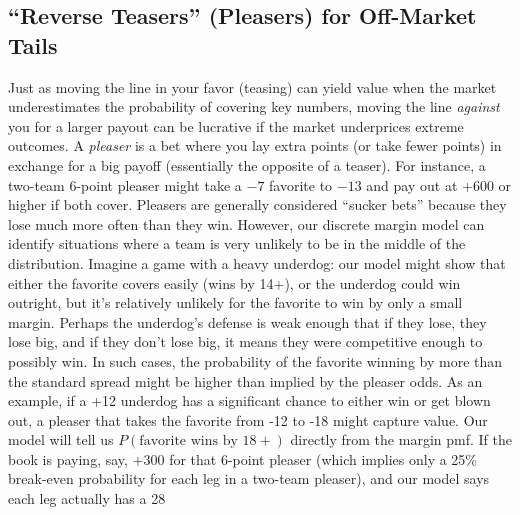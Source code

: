\documentclass[11pt]{amsart}
\begin{document}
\subsection{``Reverse Teasers'' (Pleasers) for Off-Market Tails}
Just as moving the line in your favor (teasing) can yield value when the market underestimates the probability of covering key numbers, moving the line \emph{against} you for a larger payout can be lucrative if the market underprices extreme outcomes. A \textit{pleaser} is a bet where you lay extra points (or take fewer points) in exchange for a big payoff (essentially the opposite of a teaser). For instance, a two-team 6-point pleaser might take a \(-7\) favorite to \(-13\) and pay out at +600 or higher if both cover. Pleasers are generally considered ``sucker bets'' because they lose much more often than they win. However, our discrete margin model can identify situations where a team is very unlikely to be in the middle of the distribution. Imagine a game with a heavy underdog: our model might show that either the favorite covers easily (wins by 14+), or the underdog could win outright, but it’s relatively unlikely for the favorite to win by only a small margin. Perhaps the underdog’s defense is weak enough that if they lose, they lose big, and if they don’t lose big, it means they were competitive enough to possibly win. In such cases, the probability of the favorite winning by more than the standard spread might be higher than implied by the pleaser odds. As an example, if a +12 underdog has a significant chance to either win or get blown out, a pleaser that takes the favorite from -12 to -18 might capture value. Our model will tell us $P(\text{favorite wins by }18+)$ directly from the margin pmf. If the book is paying, say, +300 for that 6-point pleaser (which implies only a 25\% break-even probability for each leg in a two-team pleaser), and our model says each leg actually has a 28%
\end{document}
